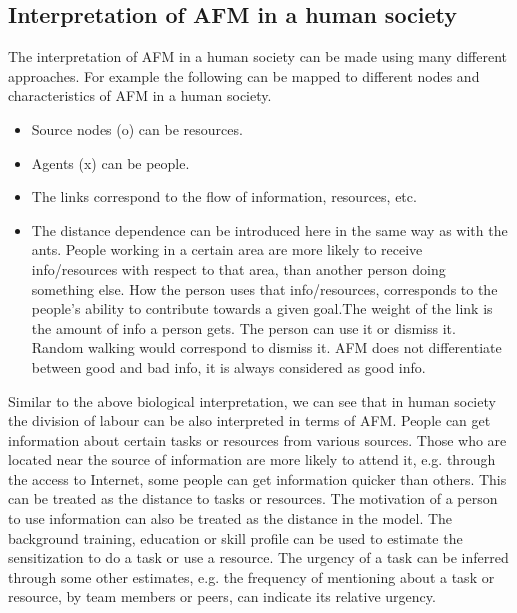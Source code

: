\subsection{Interpretation of AFM in a human society}
The interpretation of AFM  in a human society can be made using many different approaches. For example the following can be mapped to different nodes and characteristics of AFM in a human society.
\begin{itemize}
\item Source nodes (o) can be resources.
\item Agents (x) can be people.
\item The links correspond to the flow of information, resources, etc.
\item The distance dependence can be introduced here in the same way as with the ants. People working in a certain area are more likely to receive info/resources with respect to that area, than another person doing something else. How the person uses that info/resources, corresponds to the people's ability to contribute towards a given goal.The weight of the link is the amount of info a person gets. The person can use it or dismiss it. Random walking would correspond to dismiss it. AFM does not differentiate between good and bad info, it is always considered as good info. 
\end{itemize}
Similar to the above biological interpretation, we can see that in human society the division of labour can be also interpreted in terms of AFM. People can get information about certain tasks or resources from various sources. Those who are located near the source of information are more likely to attend it, e.g. through the access to Internet, some people can get information quicker than others. This can be treated as the distance to tasks or resources. The motivation of a person to use information can also be treated as the distance in the model. The background training, education or skill profile can be used to estimate the sensitization to do a task or use a resource. The urgency of a task can be inferred through some other estimates, e.g. the frequency of mentioning about a task or resource, by team members or peers, can indicate its relative urgency.
